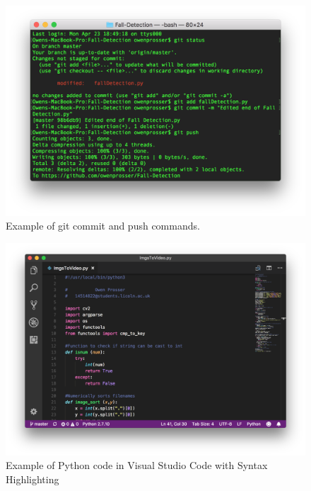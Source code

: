 \documentclass[11pt,a4paper]{report}
\begin{document}
\begin{figure}[h]
 \centering
 \includegraphics[scale = 0.55]{gitpush.png}
 \caption{Example of git commit and push commands.}
 \label{fig:GitCommitPush}
\end{figure}

\begin{figure}[H]
 \centering
 \includegraphics[scale = 0.4]{VSCode.png}
 \caption{Example of Python code in Visual Studio Code with Syntax Highlighting}
 \label{fig:VSCode}
\end{figure}
\end{document}
